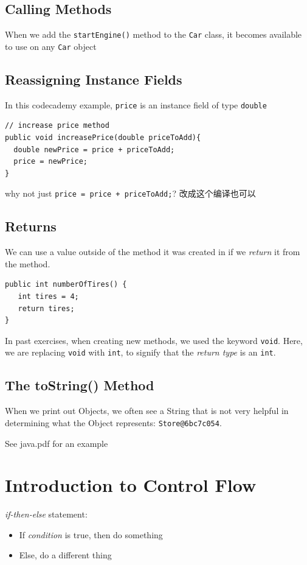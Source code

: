 \documentclass[a4paper, 12pt]{article}
\begin{document}
\subsection{Calling Methods}
When we add the \verb|startEngine()| method to the \verb|Car| class, it becomes available to use on any \verb|Car| object

\subsection{Reassigning Instance Fields}
In this codecademy example, \verb|price| is an instance field of type \verb|double|
\begin{verbatim}
// increase price method
public void increasePrice(double priceToAdd){
  double newPrice = price + priceToAdd;
  price = newPrice;
}
\end{verbatim}
why not just \verb|price = price + priceToAdd;|? 改成这个编译也可以

\subsection{Returns}
We can use a value outside of the method it was created in if we \textit{return} it from the method.
\begin{verbatim}
public int numberOfTires() {
   int tires = 4;
   return tires;
}
\end{verbatim}
In past exercises, when creating new methods, we used the keyword \verb|void|. Here, we are replacing \verb|void| with \verb|int|, to signify that the \textit{return type} is an \verb|int|.

\subsection{The toString() Method}
When we print out Objects, we often see a String that is not very helpful in determining what the Object represents: \verb|Store@6bc7c054|.

See java.pdf for an example


\section{Introduction to Control Flow}
\textit{if-then-else} statement:
\begin{itemize}
\item If \textit{condition} is true, then do something

\item Else, do a different thing

\end{itemize}
\end{document}
